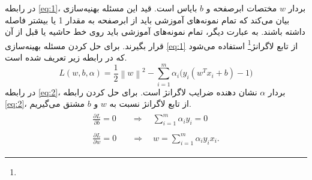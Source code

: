 \noindent در رابطه \ref{eq:1}، بردار $w$ مختصات ابرصفحه و $b$ بایاس است. قید این مسئله بهنیه‌سازی بیان می‌کند که تمام نمونه‌های آموزشی باید از ابرصفحه به مقدار 1 یا بیشتر فاصله داشته باشند. به عبارت دیگر، تمام نمونه‌های آموزشی باید روی خط حاشیه یا قبل از آن قرار بگیرند. برای حل کردن مسئله بهینه‌سازی \ref{eq:1} از تابع لاگرانژ\footnote{}  استفاده می‌شود که در رابطه زیر تعریف شده است. 
\begin{equation}
L(w,b,\alpha )=\frac{1}{2}{{\left\| w \right\|}^{2}}-\sum\limits_{i=1}^{m}{{{\alpha }_{i}}({{y}_{i}}({{w}^{T}}{{x}_{i}}+b)-1})
\label{eq:2}
\end{equation} 
در رابطه \ref{eq:2}، بردار $\alpha$ نشان دهنده ضرایب لاگرانژ است. برای حل کردن رابطه \ref{eq:2}، از تابع لاگرانژ نسبت به $w$ و  $b$ مشتق می‌گیریم.
\begin{align}
\label{eq:3}
\begin{split}
\frac{\partial L}{\partial b}=0&\quad \Rightarrow \quad \sum\limits_{i=1}^{m}{{{\alpha }_{i}}{{y}_{i}}}=0 
\end{split}\\ 
\label{eq:4}
\begin{split}
\frac{\partial L}{\partial w}=0& \quad \Rightarrow \quad w = \sum\limits_{i=1}^{m}{\alpha_{i}y_{i}x_{i}}. 
\end{split} 
\end{align}

